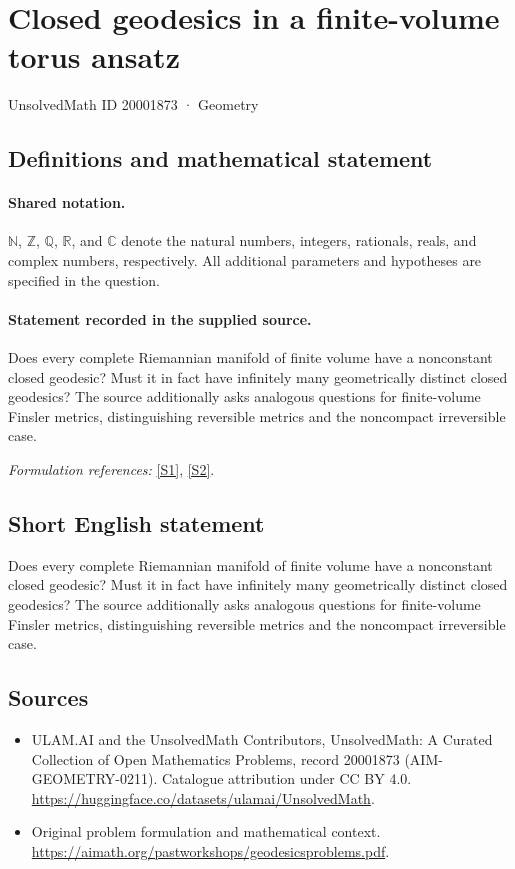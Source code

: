 \documentclass[11pt]{article}
\newcommand{\sref}[2]{\hyperlink{source:#1:#2}{[S#2]}}
\begin{document}
\setcounter{section}{20001872}
\section{Closed geodesics in a finite-volume torus ansatz}\label{20001873}
{\small UnsolvedMath ID 20001873 · Geometry}
\subsection{Definitions and mathematical statement}

\paragraph{Shared notation.}$\mathbb N$, $\mathbb Z$, $\mathbb Q$, $\mathbb R$, and $\mathbb C$ denote the natural numbers, integers, rationals, reals, and complex numbers, respectively. All additional parameters and hypotheses are specified in the question.


\paragraph{Statement recorded in the supplied source.}
Does every complete Riemannian manifold of finite volume have a nonconstant closed geodesic? Must it in fact have infinitely many geometrically distinct closed geodesics? The source additionally asks analogous questions for finite-volume Finsler metrics, distinguishing reversible metrics and the noncompact irreversible case.
\par\smallskip\textit{Formulation references:} \sref{20001873}{1}, \sref{20001873}{2}.
\subsection{Short English statement}
Does every complete Riemannian manifold of finite volume have a nonconstant closed geodesic? Must it in fact have infinitely many geometrically distinct closed geodesics? The source additionally asks analogous questions for finite-volume Finsler metrics, distinguishing reversible metrics and the noncompact irreversible case.
\subsection{Sources}
\begin{itemize}
\item[\hypertarget{source:20001873:1}{S1}] ULAM.AI and the UnsolvedMath Contributors, UnsolvedMath: A Curated Collection of Open Mathematics Problems, record 20001873 (AIM-GEOMETRY-0211). Catalogue attribution under CC BY 4.0.
\url{https://huggingface.co/datasets/ulamai/UnsolvedMath}.
\item[\hypertarget{source:20001873:2}{S2}] Original problem formulation and mathematical context.
\url{https://aimath.org/pastworkshops/geodesicsproblems.pdf}.
\end{itemize}
\label{end:20001873}
\end{document}
